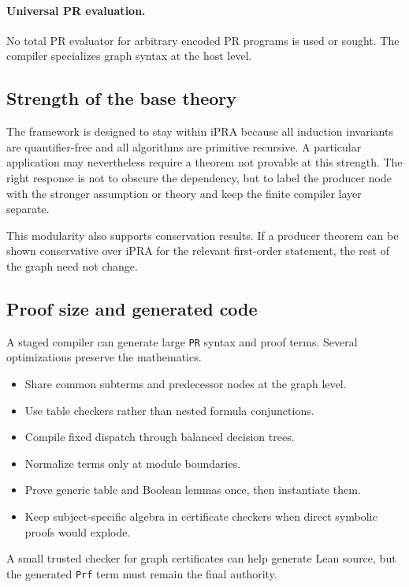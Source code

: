 \paragraph{Universal PR evaluation.}
No total PR evaluator for arbitrary encoded PR programs is used or sought.
The compiler specializes graph syntax at the host level.

\subsection{Strength of the base theory}

The framework is designed to stay within iPRA because all induction invariants
are quantifier-free and all algorithms are primitive recursive.  A particular
application may nevertheless require a theorem not provable at this strength.
The right response is not to obscure the dependency, but to label the producer
node with the stronger assumption or theory and keep the finite compiler layer
separate.

This modularity also supports conservation results.  If a producer theorem can
be shown conservative over iPRA for the relevant first-order statement, the
rest of the graph need not change.

\subsection{Proof size and generated code}

A staged compiler can generate large \texttt{PR} syntax and proof terms.
Several optimizations preserve the mathematics.

\begin{itemize}
\item Share common subterms and predecessor nodes at the graph level.
\item Use table checkers rather than nested formula conjunctions.
\item Compile fixed dispatch through balanced decision trees.
\item Normalize terms only at module boundaries.
\item Prove generic table and Boolean lemmas once, then instantiate them.
\item Keep subject-specific algebra in certificate checkers when direct
symbolic proofs would explode.
\end{itemize}

A small trusted checker for graph certificates can help generate Lean source,
but the generated \texttt{Prf} term must remain the final authority.

